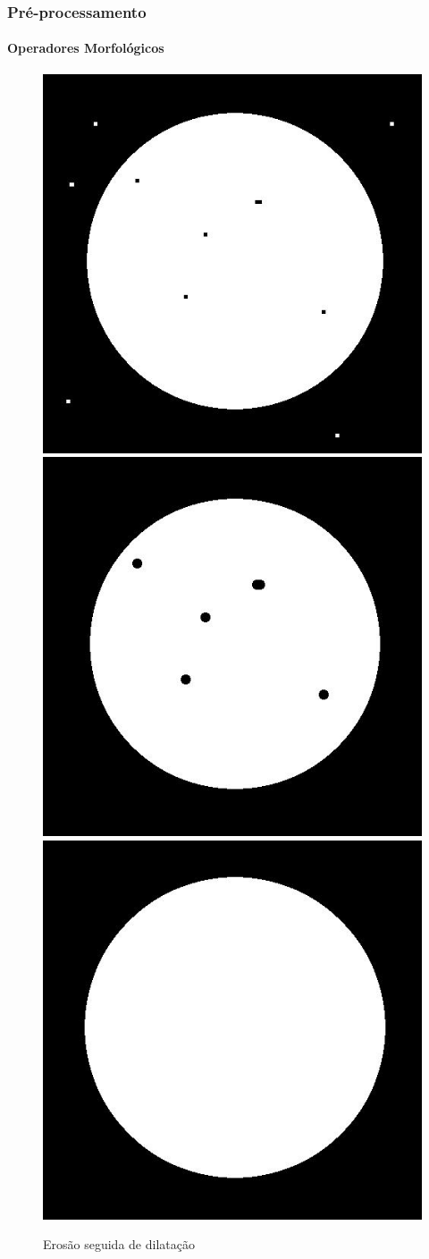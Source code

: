 \documentclass{beamer}
\begin{document}
    \begin{frame}
      \frametitle{Pré-processamento}
      \framesubtitle{Operadores Morfológicos}
    
        \begin{figure}[hbt]
          \begin{center}
          \caption{Erosão seguida de dilatação}
            \includegraphics[width=0.3\linewidth]{img/ball/03-otsu.jpg}
            \quad
            \includegraphics[width=0.3\linewidth]{img/ball/04-erode.jpg}
            \quad
            \includegraphics[width=0.3\linewidth]{img/ball/05-dilate.jpg}
          \end{center}
        \end{figure}
        
    \end{frame}
    
\end{document}
